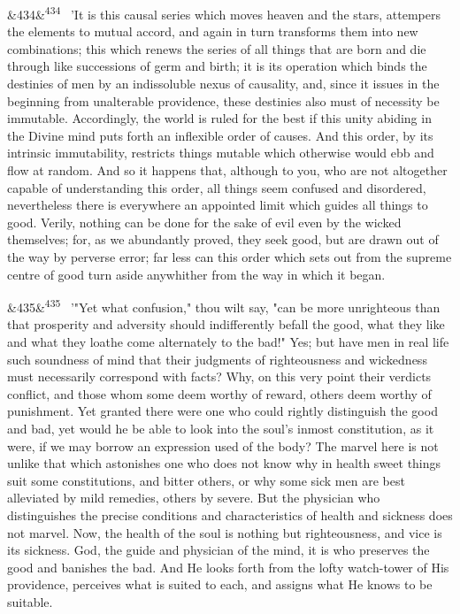\documentclass[12pt]{article}
\newcommand{\para}[1][]{\par\noindent\ifx&#1&\else\textsuperscript{\footnotesize #1}~\fi}
\begin{document}
\para[434] 'It is this causal series which moves heaven and the stars, attempers the elements to mutual accord, and again in turn transforms them into new combinations; this which renews the series of all things that are born and die through like successions of germ and birth; it is its operation which binds the destinies of men by an indissoluble nexus of causality, and, since it issues in the beginning from unalterable providence, these destinies also must of necessity be immutable. Accordingly, the world is ruled for the best if this unity abiding in the Divine mind puts forth an inflexible order of causes. And this order, by its intrinsic immutability, restricts things mutable which otherwise would ebb and flow at random. And so it happens that, although to you, who are not altogether capable of understanding this order, all things seem confused and disordered, nevertheless there is everywhere an appointed limit which guides all things to good. Verily, nothing can be done for the sake of evil even by the wicked themselves; for, as we abundantly proved, they seek good, but are drawn out of the way by perverse error; far less can this order which sets out from the supreme centre of good turn aside anywhither from the way in which it began.

\para[435] '"Yet what confusion," thou wilt say, "can be more unrighteous than that prosperity and adversity should indifferently befall the good, what they like and what they loathe come alternately to the bad!" Yes; but have men in real life such soundness of mind that their judgments of righteousness and wickedness must necessarily correspond with facts? Why, on this very point their verdicts conflict, and those whom some deem worthy of reward, others deem worthy of punishment. Yet granted there were one who could rightly distinguish the good and bad, yet would he be able to look into the soul's inmost constitution, as it were, if we may borrow an expression used of the body? The marvel here is not unlike that which astonishes one who does not know why in health sweet things suit some constitutions, and bitter others, or why some sick men are best alleviated by mild remedies, others by severe. But the physician who distinguishes the precise conditions and characteristics of health and sickness does not marvel. Now, the health of the soul is nothing but righteousness, and vice is its sickness. God, the guide and physician of the mind, it is who preserves the good and banishes the bad. And He looks forth from the lofty watch-tower of His providence, perceives what is suited to each, and assigns what He knows to be suitable.
\end{document}

